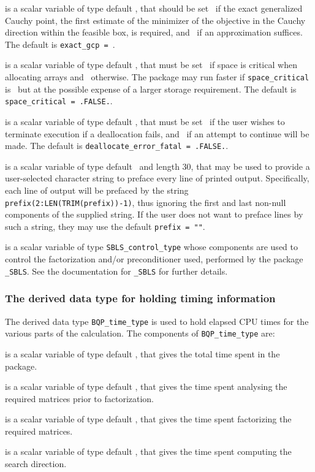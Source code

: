 \documentclass{galahad}
\newcommand{\packagename}{BQP}
\begin{document}
\begin{description}
 is a scalar variable of type default \logical, that should
be set \true\ if the exact generalized Cauchy point,
the first estimate of the minimizer of the objective in the
Cauchy direction within
the feasible box, is required, and \false\ if an approximation suffices.
The default is {\tt exact\_gcp = \true}.

 is a scalar variable of type default \logical, 
that must be set \true\ if space is critical when allocating arrays
and  \false\ otherwise. The package may run faster if 
{\tt space\_critical} is \false\ but at the possible expense of a larger
storage requirement. The default is {\tt space\_critical = .FALSE.}.

 is a scalar variable of type default \logical, 
that must be set \true\ if the user wishes to terminate execution if
a deallocation  fails, and \false\ if an attempt to continue
will be made. The default is {\tt deallocate\_error\_fatal = .FALSE.}.

 is a scalar variable of type default \character\
and length 30, that may be used to provide a user-selected 
character string to preface every line of printed output. 
Specifically, each line of output will be prefaced by the string 
{\tt prefix(2:LEN(TRIM(prefix))-1)},
thus ignoring the first and last non-null components of the
supplied string. If the user does not want to preface lines by such
a string, they may use the default {\tt prefix = ""}.

 is a scalar variable of type 
{\tt SBLS\_control\_type} %
whose components are used to control the factorization and/or
preconditioner used,
performed by the package 
{\tt \libraryname\_SBLS}. 
See the documentation for {\tt \libraryname\_SBLS} for further details.

\end{description}


\subsubsection{The derived data type for holding timing 
 information}\label{typetime}
The derived data type 
{\tt \packagename\_time\_type} 
is used to hold elapsed CPU times for the various parts of the calculation.
The components of 
{\tt \packagename\_time\_type} 
are:
\begin{description}
 is a scalar variable of type default \real, that gives
 the total time spent in the package.

 is a scalar variable of type default \real, that gives
 the time spent analysing the required matrices prior to factorization.

 is a scalar variable of type default \real, that gives
 the time spent factorizing the required matrices.

 is a scalar variable of type default \real, that gives
 the time spent computing the search direction.

\end{description}
\end{document}
